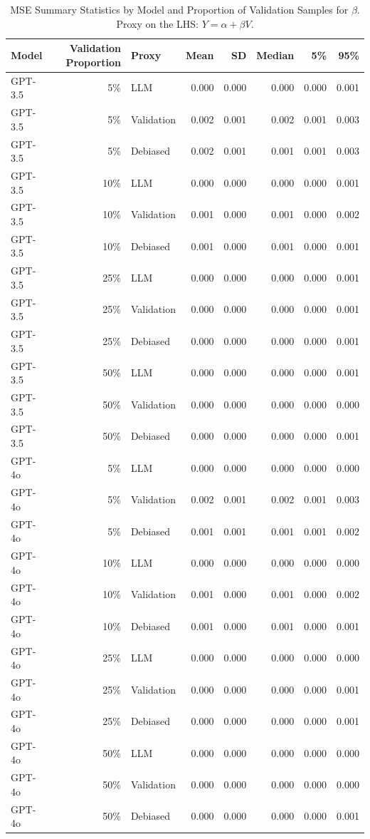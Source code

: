 \begin{table}

\caption{MSE Summary Statistics by Model and Proportion of Validation Samples for $\beta$. Proxy on the LHS: $Y = \alpha + \beta V$.}
\centering
\begin{tabular}[t]{lrlrrrrr}
\toprule
Model & Validation Proportion & Proxy & Mean & SD & Median & 5\% & 95\%\\
\midrule
GPT-3.5 & 5\% & LLM & 0.000 & 0.000 & 0.000 & 0.000 & 0.001\\
GPT-3.5 & 5\% & Validation & 0.002 & 0.001 & 0.002 & 0.001 & 0.003\\
GPT-3.5 & 5\% & Debiased & 0.002 & 0.001 & 0.001 & 0.001 & 0.003\\
GPT-3.5 & 10\% & LLM & 0.000 & 0.000 & 0.000 & 0.000 & 0.001\\
GPT-3.5 & 10\% & Validation & 0.001 & 0.000 & 0.001 & 0.000 & 0.002\\
GPT-3.5 & 10\% & Debiased & 0.001 & 0.000 & 0.001 & 0.000 & 0.001\\
GPT-3.5 & 25\% & LLM & 0.000 & 0.000 & 0.000 & 0.000 & 0.001\\
GPT-3.5 & 25\% & Validation & 0.000 & 0.000 & 0.000 & 0.000 & 0.001\\
GPT-3.5 & 25\% & Debiased & 0.000 & 0.000 & 0.000 & 0.000 & 0.001\\
GPT-3.5 & 50\% & LLM & 0.000 & 0.000 & 0.000 & 0.000 & 0.001\\
GPT-3.5 & 50\% & Validation & 0.000 & 0.000 & 0.000 & 0.000 & 0.000\\
GPT-3.5 & 50\% & Debiased & 0.000 & 0.000 & 0.000 & 0.000 & 0.001\\
GPT-4o & 5\% & LLM & 0.000 & 0.000 & 0.000 & 0.000 & 0.000\\
GPT-4o & 5\% & Validation & 0.002 & 0.001 & 0.002 & 0.001 & 0.003\\
GPT-4o & 5\% & Debiased & 0.001 & 0.001 & 0.001 & 0.001 & 0.002\\
GPT-4o & 10\% & LLM & 0.000 & 0.000 & 0.000 & 0.000 & 0.000\\
GPT-4o & 10\% & Validation & 0.001 & 0.000 & 0.001 & 0.000 & 0.002\\
GPT-4o & 10\% & Debiased & 0.001 & 0.000 & 0.001 & 0.000 & 0.001\\
GPT-4o & 25\% & LLM & 0.000 & 0.000 & 0.000 & 0.000 & 0.000\\
GPT-4o & 25\% & Validation & 0.000 & 0.000 & 0.000 & 0.000 & 0.001\\
GPT-4o & 25\% & Debiased & 0.000 & 0.000 & 0.000 & 0.000 & 0.001\\
GPT-4o & 50\% & LLM & 0.000 & 0.000 & 0.000 & 0.000 & 0.000\\
GPT-4o & 50\% & Validation & 0.000 & 0.000 & 0.000 & 0.000 & 0.000\\
GPT-4o & 50\% & Debiased & 0.000 & 0.000 & 0.000 & 0.000 & 0.001\\
\bottomrule
\end{tabular}
\end{table}
